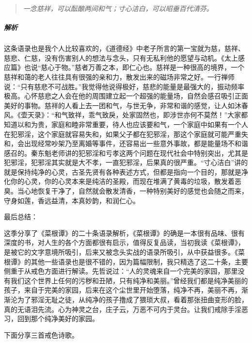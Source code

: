 \begin{quote}\it
    一念慈祥，可以酝酿两间和气；寸心洁白，可以昭垂百代清芬。
\end{quote}

\subparagraph{解析} 这条语录也是我个人比较喜欢的，《道德经》中老子所言的第一宝就为慈，慈祥、慈悲、仁慈，没有伤害别人的想法与念头，只有无私利他的愿望与动机。《太上感应篇》也说“慈心于物。”慈者万善之本，即仁心也。慈祥是一种很高的境界，一个慈祥和蔼的老人往往具有很强的亲和力，散发出来的磁场非常之好。一行禅师说：“只有慈悲不可战胜。”我觉得他说得极好，慈悲的能量是最强大的，振动频率极高。心怀慈悲之人会在他的周围建立起一个超强的能量场，自然会感召吸引正面美好的事物。慈祥的人看上去一团和气，与世无争，非常和谐的感觉，让人如沐春风。《壶天录》：“和气致祥，乖气致戾，处家固然也，即涉世亦何不莫然！”大家都知道以和为贵，家庭和睦非常重要，待人也应该要和气，一个家庭中如果有一个人在犯邪淫，这个家庭就容易失和，如果父子都在犯邪淫，那这个家庭就可能严重失和，会出现经常吵架乃至离婚等事件，还容易出一些意外事故，都是能量场不和谐感召的。秦东魁老师讲的犯邪淫和亏孝这两个问题在现代社会中特别突出，尤其是犯邪淫，犯邪淫其实就是大不孝，一直犯邪淫，后果真的很严重。“寸心洁白”讲的就是保持纯净的心灵，古圣先贤有各种表述方式，但都是指向一个目的，那就是净化你的心灵，你的心灵本来是纯洁的圣殿，而现在堆满了黄毒的垃圾，散发着恶臭。当心地恢复干净了，自然就会散发清香，一种特别美好的感觉也会随之而来，守身如莲，香远益清，本真妙韵，和润仁心。

最后总结：

这季分享了《菜根谭》的二十条语录解析，《菜根谭》的确是一本很有品味、很有深度的书，对人生的各个方面都很有启示，值得反复品读，当初我读《菜根谭》，是被它的文字意境所吸引，后来又被念头实战的语录所吸引，从中获益很多。《菜根谭》的其他一些语录也是很不错的，因为篇幅限制，我只精选了这二十条，主要侧重于从戒色方面进行解读。先哲说过：“人的灵魂来自一个完美的家园，那里没有我们这个世界上任何的污秽和丑陋，只有纯净和美丽。”曾经我们都是纯净美丽的孩子，来自于完美的家园，后来在这个尘世里开始堕落，纯净不再，美丽不再，渐渐沦为了邪淫无耻之徒，从纯净的孩子撸成了猥琐大叔，看着那张扭曲变形的脸，真的无语泪先流。心为神灵之台，庄子云，万恶不可内于灵台。让我们戒除手淫恶习，回到那个纯净美好的家园。

下面分享三首戒色诗歌。

